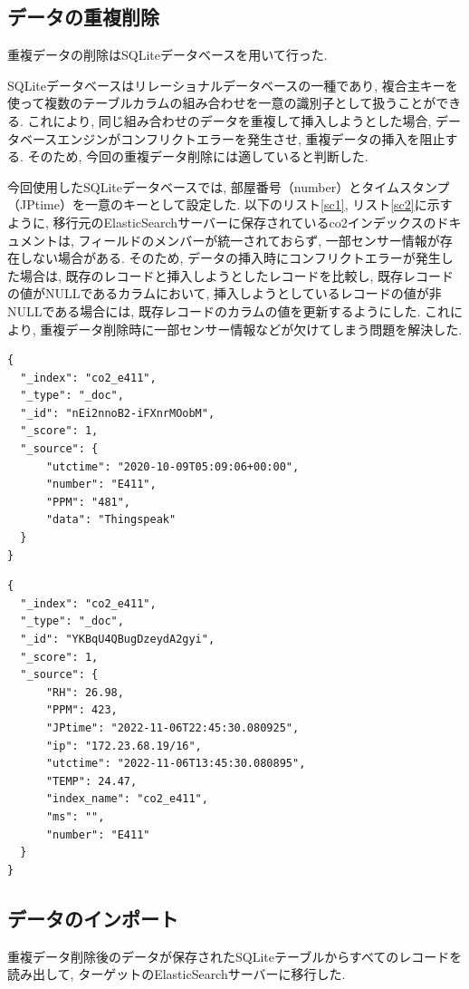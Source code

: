 \subsection{データの重複削除}
重複データの削除はSQLiteデータベースを用いて行った.

SQLiteデータベースはリレーショナルデータベースの一種であり, 複合主キーを使って複数のテーブルカラムの組み合わせを一意の識別子として扱うことができる. これにより, 同じ組み合わせのデータを重複して挿入しようとした場合, データベースエンジンがコンフリクトエラーを発生させ, 重複データの挿入を阻止する. そのため, 今回の重複データ削除には適していると判断した.

今回使用したSQLiteデータベースでは, 部屋番号（number）とタイムスタンプ（JPtime）を一意のキーとして設定した. 以下のリスト\ref{sc1}, リスト\ref{sc2}に示すように, 移行元のElasticSearchサーバーに保存されているco2インデックスのドキュメントは, フィールドのメンバーが統一されておらず, 一部センサー情報が存在しない場合がある. そのため, データの挿入時にコンフリクトエラーが発生した場合は, 既存のレコードと挿入しようとしたレコードを比較し, 既存レコードの値がNULLであるカラムにおいて, 挿入しようとしているレコードの値が非NULLである場合には, 既存レコードのカラムの値を更新するようにした. これにより, 重複データ削除時に一部センサー情報などが欠けてしまう問題を解決した.

\begin{lstlisting}[caption=\_sourceフィールドのメンバー数が少ないドキュメント, label=sc1]
{
  "_index": "co2_e411",
  "_type": "_doc",
  "_id": "nEi2nnoB2-iFXnrMOobM",
  "_score": 1,
  "_source": {
      "utctime": "2020-10-09T05:09:06+00:00",
      "number": "E411",
      "PPM": "481",
      "data": "Thingspeak"
  }
}
  \end{lstlisting}

\begin{lstlisting}[caption=\_sourceフィールドのメンバー数が多いドキュメント, label=sc2]
{
  "_index": "co2_e411",
  "_type": "_doc",
  "_id": "YKBqU4QBugDzeydA2gyi",
  "_score": 1,
  "_source": {
      "RH": 26.98,
      "PPM": 423,
      "JPtime": "2022-11-06T22:45:30.080925",
      "ip": "172.23.68.19/16",
      "utctime": "2022-11-06T13:45:30.080895",
      "TEMP": 24.47,
      "index_name": "co2_e411",
      "ms": "",
      "number": "E411"
  }
}
    \end{lstlisting}

\subsection{データのインポート}
重複データ削除後のデータが保存されたSQLiteテーブルからすべてのレコードを読み出して, ターゲットのElasticSearchサーバーに移行した.

